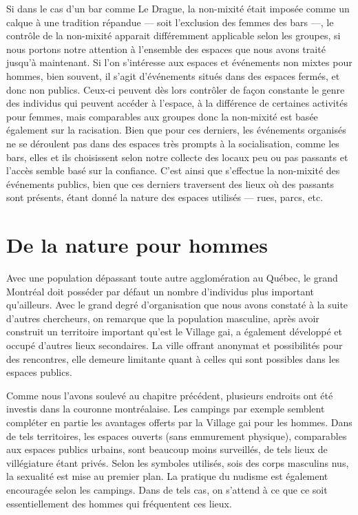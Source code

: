 Si dans le cas d'un bar comme Le Drague, la non-mixité était imposée comme un calque à une tradition répandue --- soit l'exclusion des femmes des bars ---, le contrôle de la non-mixité apparait différemment applicable selon les groupes, si nous portons notre attention à l'ensemble des espaces que nous avons traité jusqu'à maintenant.
Si l'on s'intéresse aux espaces et événements non mixtes pour hommes, bien souvent, il s'agit d'événements situés dans des espaces fermés, et donc non publics.
Ceux-ci peuvent dès lors contrôler de façon constante le genre des individus qui peuvent accéder à l'espace, à la différence de certaines activités pour femmes, mais comparables aux groupes donc la non-mixité est basée également sur la racisation.
Bien que pour ces derniers, les événements organisés ne se déroulent pas dans des espaces très prompts à la socialisation, comme les bars, elles et ils choisissent selon notre collecte des locaux peu ou pas passants et l'accès semble basé sur la confiance.
C'est ainsi que s'effectue la non-mixité des événements publics, bien que ces derniers traversent des lieux où des passants sont présents, étant donné la nature des espaces utilisés --- rues, parcs, etc.

\section{De la nature pour hommes}
\label{sec:de_la_nature_pour_hommes}

Avec une population dépassant toute autre agglomération au Québec, le grand Montréal doit posséder par défaut un nombre d'individus \lgbt{} plus important qu'ailleurs.
Avec le grand degré d'organisation que nous avons constaté à la suite d'autres chercheurs, on remarque que la population masculine, après avoir construit un territoire important qu'est le Village gai, a également développé et occupé d'autres lieux secondaires.
La ville offrant anonymat et possibilités pour des rencontres, elle demeure limitante quant à celles qui sont possibles dans les espaces publics.

Comme nous l'avons soulevé au chapitre précédent, plusieurs endroits ont été investis dans la couronne montréalaise.
Les campings par exemple semblent compléter en partie les avantages offerts par la Village gai pour les hommes.
Dans de tels territoires, les espaces ouverts (sans emmurement physique), comparables aux espaces publics urbains, sont beaucoup moins surveillés, de tels lieux de villégiature étant  privés.
Selon les symboles utilisés, sois des corps masculins nus, la sexualité est mise au premier plan.
La pratique du nudisme est également encouragée selon les campings.
Dans de tels cas, on s'attend à ce que ce soit essentiellement des hommes qui fréquentent ces lieux.

